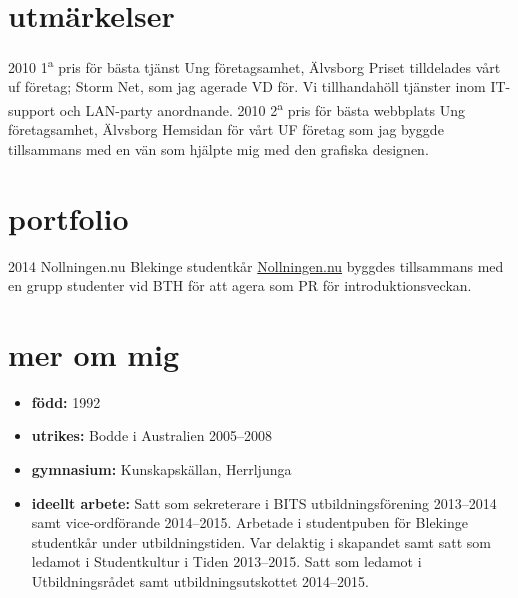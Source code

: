 \documentclass[]{friggeri-cv} %
\begin{document}

\section{utmärkelser}

\begin{entrylist}
\entry
{2010}
{1\textsuperscript{a} pris för bästa tjänst}
{Ung företagsamhet, Älvsborg}
{Priset tilldelades vårt uf företag; Storm Net, som jag agerade VD för. Vi tillhandahöll tjänster inom IT-support och LAN-party anordnande.}
\entry
{2010}
{2\textsuperscript{a} pris för bästa webbplats}
{Ung företagsamhet, Älvsborg}
{Hemsidan för vårt UF företag som jag byggde tillsammans med en vän som hjälpte mig med den grafiska designen.}
\end{entrylist}

\newpage
\section{portfolio}

\begin{entrylist}
\entry
{2014}
{Nollningen.nu}
{Blekinge studentkår}
{\href{http://www.nollningen.nu}{Nollningen.nu} byggdes tillsammans med en grupp studenter vid BTH för att agera som PR för introduktionsveckan.}
\end{entrylist}


\section{mer om mig}
\begin{itemize}
	\item \textbf{född:} 1992
	\item \textbf{utrikes:} Bodde i Australien 2005--2008
	\item \textbf{gymnasium:} Kunskapskällan, Herrljunga
	\item \textbf{ideellt arbete:} Satt som sekreterare i BITS utbildningsförening 2013--2014 samt vice-ordförande 2014--2015. Arbetade i studentpuben för Blekinge studentkår under utbildningstiden. Var delaktig i skapandet samt satt som ledamot i Studentkultur i Tiden 2013--2015. Satt som ledamot i Utbildningsrådet samt utbildningsutskottet 2014--2015.
\end{itemize}
\end{document}
